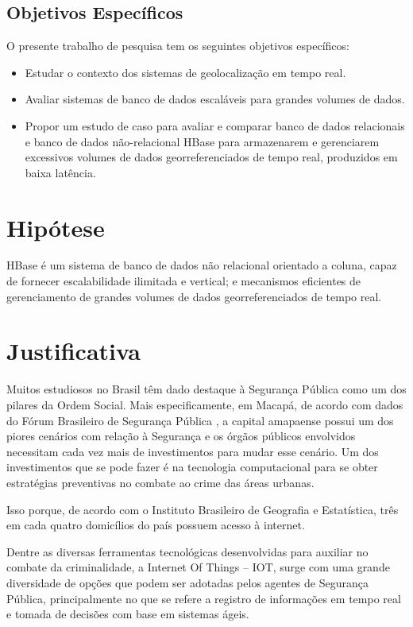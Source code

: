 \subsection {Objetivos Específicos}

O presente trabalho de pesquisa tem os seguintes objetivos específicos:

\begin{itemize}
	\item Estudar o contexto dos sistemas de geolocalização em tempo real.
	\item Avaliar sistemas de banco de dados escaláveis para grandes volumes de dados.
	\item Propor um estudo de caso para avaliar e comparar banco de dados relacionais e banco de dados não-relacional HBase para armazenarem e gerenciarem excessivos volumes de dados georreferenciados de tempo real, produzidos em baixa latência.
	 
\end{itemize}

\section {Hipótese}

HBase é um sistema de banco de dados não relacional orientado a coluna, capaz de fornecer escalabilidade ilimitada e vertical; e mecanismos eficientes de gerenciamento de grandes volumes de dados georreferenciados de tempo real.

\section {Justificativa}
Muitos estudiosos no Brasil têm dado destaque à Segurança Pública como um dos pilares da Ordem Social. Mais especificamente, em Macapá, de acordo com dados do Fórum Brasileiro de Segurança Pública \cite{forumdeseguranca:2018}, a capital amapaense possui um dos piores cenários com relação à Segurança e os órgãos públicos envolvidos necessitam cada vez mais de investimentos para mudar esse cenário. Um dos investimentos que se pode fazer é na tecnologia computacional para se obter estratégias preventivas no combate ao crime das áreas urbanas.

Isso porque, de acordo com o Instituto Brasileiro de Geografia e Estatística, três em cada quatro domicílios do país possuem acesso à internet\cite{IBGE-2018}.

Dentre as diversas ferramentas tecnológicas desenvolvidas para auxiliar no combate da criminalidade, a Internet Of Things -- IOT, surge com uma grande diversidade de opções que podem ser adotadas pelos agentes de Segurança Pública, principalmente no que se refere a registro de informações em tempo real e tomada de decisões com base em sistemas ágeis.


